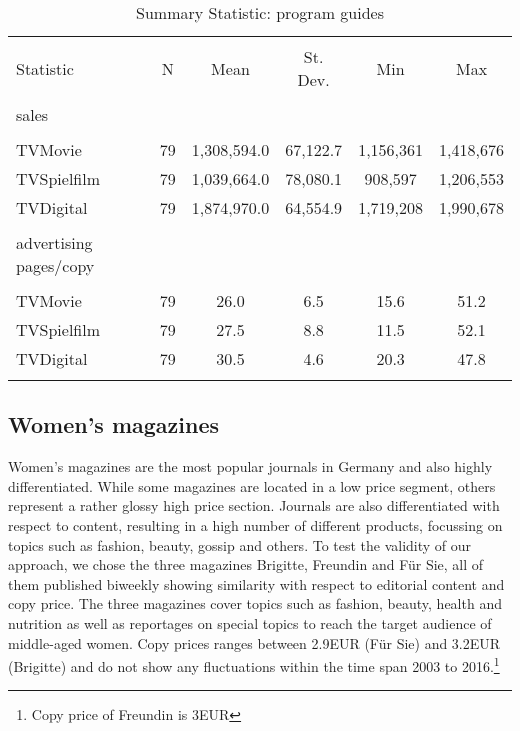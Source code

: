 \documentclass[12pt,a4paper,notitlepage]{article}
\begin{document}
\begin{table}[!htbp] \centering 
  \caption{Summary Statistic: program guides} 
  \label{tab_tv1} 
\begin{tabular}{@{\extracolsep{5pt}}lccccc} 
\\[-1.8ex]\hline 
\hline \\[-1.8ex] 
Statistic & \multicolumn{1}{c}{N} & \multicolumn{1}{c}{Mean} & \multicolumn{1}{c}{St. Dev.} & \multicolumn{1}{c}{Min} & \multicolumn{1}{c}{Max} \\ 
\hline \\[-1.8ex] 
sales \\
\hline \\[-1.8ex]
TVMovie & 79 & 1,308,594.0 & 67,122.7 & 1,156,361 & 1,418,676 \\ 
TVSpielfilm & 79 & 1,039,664.0 & 78,080.1 & 908,597 & 1,206,553 \\ 
TVDigital & 79 & 1,874,970.0 & 64,554.9 & 1,719,208 & 1,990,678 \\ 
\hline \\[-1.8ex] 
advertising pages/copy \\
\hline \\[-1.8ex]
TVMovie & 79 & 26.0 & 6.5 & 15.6 & 51.2 \\ 
TVSpielfilm & 79 & 27.5 & 8.8 & 11.5 & 52.1 \\ 
TVDigital & 79 & 30.5 & 4.6 & 20.3 & 47.8 \\ 
\hline \\[-1.8ex] 
\end{tabular} 
\end{table}



\subsection{Women's magazines}


Women's magazines are the most popular journals in Germany and also highly differentiated. While some magazines are located in a low price segment, others represent a rather glossy high price section. Journals are also differentiated with respect to content, resulting in a high number of different products, focussing on topics such as fashion, beauty, gossip and others. To test the validity of our approach, we chose the three magazines Brigitte, Freundin and Für Sie, all of them published biweekly showing similarity with respect to editorial content and copy price. The three magazines cover topics such as fashion, beauty, health and nutrition as well as reportages on special topics to reach the target audience of middle-aged women. Copy prices ranges between 2.9EUR (Für Sie) and 3.2EUR (Brigitte) and do not show any fluctuations within the time span 2003 to 2016.\footnote{Copy price of Freundin is 3EUR} 
\end{document}
